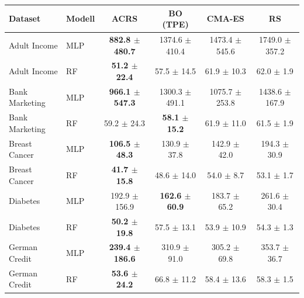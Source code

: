 \begin{tabular}{llcccc}
\toprule
Dataset & Modell & ACRS & BO (TPE) & CMA-ES & RS \\
\midrule
Adult Income & MLP & \textbf{882.8 $\pm$ 480.7} & 1374.6 $\pm$ 410.4 & 1473.4 $\pm$ 545.6 & 1749.0 $\pm$ 357.2 \\
Adult Income & RF & \textbf{51.2 $\pm$ 22.4} & 57.5 $\pm$ 14.5 & 61.9 $\pm$ 10.3 & 62.0 $\pm$ 1.9 \\
\midrule
Bank Marketing & MLP & \textbf{966.1 $\pm$ 547.3} & 1300.3 $\pm$ 491.1 & 1075.7 $\pm$ 253.8 & 1438.6 $\pm$ 167.9 \\
Bank Marketing & RF & 59.2 $\pm$ 24.3 & \textbf{58.1 $\pm$ 15.2} & 61.9 $\pm$ 11.0 & 61.5 $\pm$ 1.9 \\
\midrule
Breast Cancer & MLP & \textbf{106.5 $\pm$ 48.3} & 130.9 $\pm$ 37.8 & 142.9 $\pm$ 42.0 & 194.3 $\pm$ 30.9 \\
Breast Cancer & RF & \textbf{41.7 $\pm$ 15.8} & 48.6 $\pm$ 14.0 & 54.0 $\pm$ 8.7 & 53.1 $\pm$ 1.7 \\
\midrule
Diabetes & MLP & 192.9 $\pm$ 156.9 & \textbf{162.6 $\pm$ 60.9} & 183.7 $\pm$ 65.2 & 261.6 $\pm$ 30.4 \\
Diabetes & RF & \textbf{50.2 $\pm$ 19.8} & 57.5 $\pm$ 13.1 & 53.9 $\pm$ 10.9 & 54.3 $\pm$ 1.3 \\
\midrule
German Credit & MLP & \textbf{239.4 $\pm$ 186.6} & 310.9 $\pm$ 91.0 & 305.2 $\pm$ 69.8 & 353.7 $\pm$ 36.7 \\
German Credit & RF & \textbf{53.6 $\pm$ 24.2} & 66.8 $\pm$ 11.2 & 58.4 $\pm$ 13.6 & 58.3 $\pm$ 1.5 \\
\bottomrule
\end{tabular}
